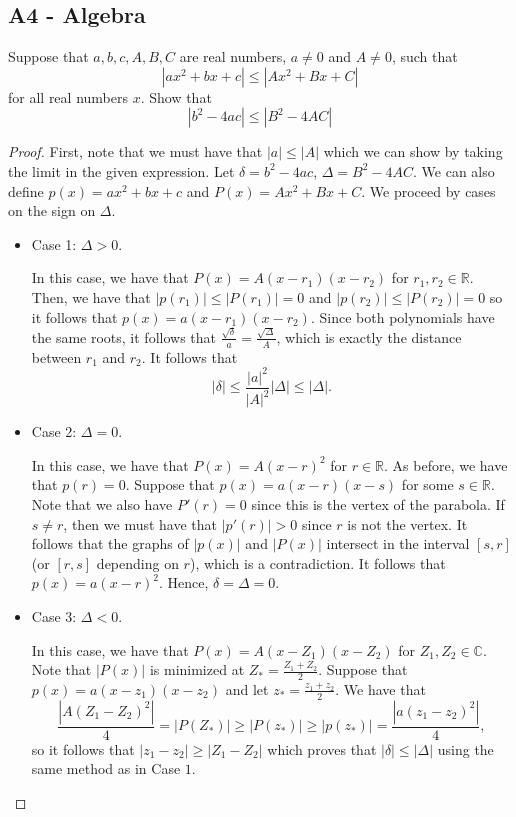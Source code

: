 \documentclass[11pt]{scrartcl}
\newcommand{\R}{\mathbb{R}}
\newcommand{\C}{\mathbb C}
\newcommand{\<}{\langle}
\renewcommand{\>}{\rangle}
\begin{document}
\subsection{A4 - Algebra}
Suppose that $a, b, c, A, B, C$ are real numbers, $a \not= 0$ and $A \not= 0$, such that\[|ax^2+ bx + c| \le |Ax^2+ Bx + C|\]for all real numbers $x$. Show that\[|b^2- 4ac| \le |B^2- 4AC|\]
\begin{proof}
First, note that we must have that $|a| \le |A|$ which we can show by taking the limit in the given expression.  Let $\delta = b^2 - 4ac$, $\Delta = B^2 - 4AC$.  We can also define $p(x) = ax^2 + bx + c$ and $P(x) = Ax^2 + Bx + C$.  
We proceed by cases on the sign on $\Delta$.
\begin{itemize}
\item Case 1: $\Delta > 0$.

In this case, we have that $P(x) = A(x-r_1)(x - r_2)$ for $r_1, r_2 \in \R$.  Then, we have that $|p(r_1)| \le |P(r_1)| = 0$ and $|p(r_2)| \le |P(r_2)| = 0$ so it follows that $p(x) = a(x-r_1)(x-r_2)$.  Since both polynomials have the same roots, it follows that $\frac{\sqrt{\delta}}{a} = \frac{\sqrt{\Delta}}{A}$, which is exactly the distance between $r_1$ and $r_2$.  It follows that 
$$|\delta| \le \frac{|a|^2}{|A|^2} |\Delta| \le |\Delta|.$$
\item Case 2: $\Delta = 0$.

In this case, we have that $P(x) = A(x-r)^2$ for $r \in \R$.  As before, we have that $p(r) = 0$.  Suppose that $p(x) = a(x-r)(x-s)$ for some $s \in \R$.  Note that we also have $P'(r) = 0$ since this is the vertex of the parabola.  If $s \ne r$, then we must have that $|p'(r)| > 0$ since $r$ is not the vertex.  It follows that the graphs of $|p(x)|$ and $|P(x)|$ intersect in the interval $[s, r]$(or $[r, s]$ depending on $r$), which is a contradiction.  It follows that $p(x) = a(x-r)^2$. Hence, $\delta = \Delta = 0$.

\item Case 3: $\Delta < 0$.  

In this case, we have that $P(x) = A(x-Z_1)(x-Z_2)$ for $Z_1, Z_2 \in \C$.  Note that $|P(x)|$ is minimized at $Z_* = \frac{Z_1+Z_2}{2}$.  Suppose that $p(x) = a(x - z_1)(x - z_2)$ and let $z_* = \frac{z_1+z_2}{2}$.  We have that 
$$\frac{|A(Z_1 - Z_2)^2|}{4} =  |P(Z_*)| \ge |P(z_*)| \ge |p(z_*)| = \frac{|a(z_1 - z_2)^2|}{4},$$
so it follows that $|z_1 - z_2| \ge |Z_1 -  Z_2|$ which proves that $|\delta| \le |\Delta|$ using the same method as in Case $1$.  
\end{itemize}


\end{proof}
\pagebreak
\end{document}

